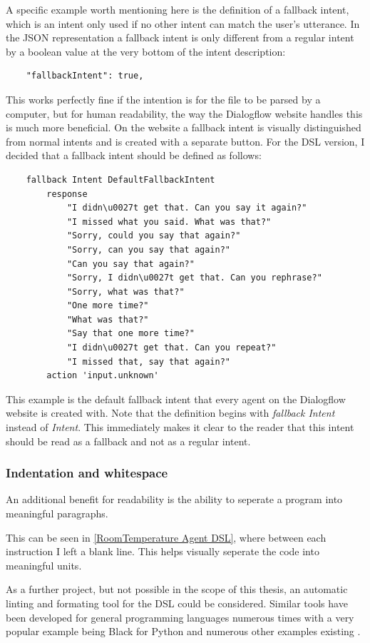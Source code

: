 A specific example worth mentioning here is the definition of a fallback intent, which is an intent only used if no other intent can match the user's utterance.
In the JSON representation a fallback intent is only different from a regular intent by a boolean value at the very bottom of the intent description:
\begin{lstlisting}
    "fallbackIntent": true,
\end{lstlisting}
This works perfectly fine if the intention is for the file to be parsed by a computer, but for human readability, the way the Dialogflow website handles this is much more beneficial.
On the website a fallback intent is visually distinguished from normal intents and is created with a separate button.
For the DSL version, I decided that a fallback intent should be defined as follows:
\begin{lstlisting}
    fallback Intent DefaultFallbackIntent
        response 
            "I didn\u0027t get that. Can you say it again?"
            "I missed what you said. What was that?"
            "Sorry, could you say that again?"
            "Sorry, can you say that again?"
            "Can you say that again?"
            "Sorry, I didn\u0027t get that. Can you rephrase?"
            "Sorry, what was that?"
            "One more time?"
            "What was that?"
            "Say that one more time?"
            "I didn\u0027t get that. Can you repeat?"
            "I missed that, say that again?"
        action 'input.unknown'
\end{lstlisting}
This example is the default fallback intent that every agent on the Dialogflow website is created with. Note that the definition begins with \textit{fallback Intent} instead of \textit{Intent}. This immediately makes it clear to the reader that this intent should be read as a fallback and not as a regular intent.

\subsubsection{Indentation and whitespace}

An additional benefit for readability is the ability to seperate a program into meaningful paragraphs.

This can be seen in \autoref{RoomTemperature Agent DSL}, where between each instruction I left a blank line. This helps visually seperate the code into meaningful units.

As a further project, but not possible in the scope of this thesis, an automatic linting and formating tool for the DSL could be considered. Similar tools have been developed for general programming languages numerous times with a very popular example being Black for Python \cite{Python} and numerous other examples existing \cite{Github}.

